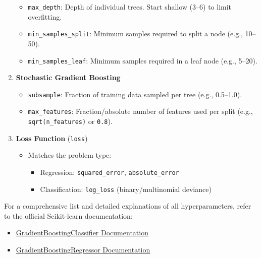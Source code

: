 \documentclass[
  letterpaper,
  DIV=11,
  numbers=noendperiod]{scrreprt}
\providecommand{\tightlist}{%
  \setlength{\itemsep}{0pt}\setlength{\parskip}{0pt}}\usepackage{longtable,booktabs,array}
\begin{document}
\begin{enumerate}
  \begin{itemize}
  \tightlist
  \item
    \texttt{max\_depth}: Depth of individual trees. Start shallow (3--6)
    to limit overfitting.\\
  \item
    \texttt{min\_samples\_split}: Minimum samples required to split a
    node (e.g., 10--50).\\
  \item
    \texttt{min\_samples\_leaf}: Minimum samples required in a leaf node
    (e.g., 5--20).
  \end{itemize}
\item
  \textbf{Stochastic Gradient Boosting}

  \begin{itemize}
  \tightlist
  \item
    \texttt{subsample}: Fraction of training data sampled per tree
    (e.g., 0.5--1.0).\\
  \item
    \texttt{max\_features}: Fraction/absolute number of features used
    per split (e.g., \texttt{sqrt(n\_features)} or \texttt{0.8}).
  \end{itemize}
\item
  \textbf{Loss Function} (\texttt{loss})

  \begin{itemize}
  \tightlist
  \item
    Matches the problem type:

    \begin{itemize}
    \tightlist
    \item
      Regression: \texttt{squared\_error}, \texttt{absolute\_error}
    \item
      Classification: \texttt{log\_loss} (binary/multinomial deviance)
    \end{itemize}
  \end{itemize}
\end{enumerate}

For a comprehensive list and detailed explanations of all
hyperparameters, refer to the official Scikit-learn documentation:

\begin{itemize}
\tightlist
\item
  \href{https://scikit-learn.org/stable/modules/generated/sklearn.ensemble.GradientBoostingClassifier.html}{GradientBoostingClassifier
  Documentation}
\item
  \href{https://scikit-learn.org/stable/modules/generated/sklearn.ensemble.GradientBoostingRegressor.html}{GradientBoostingRegressor
  Documentation}
\end{itemize}
\end{document}
